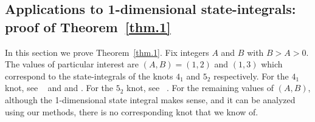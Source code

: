 \documentclass[12pt]{amsart}
\theoremstyle{definition}
\begin{document}
\subsection{Applications to 1-dimensional state-integrals: 
proof of Theorem~\ref{thm.1}}
\label{sub.application}

In this section we prove Theorem~\ref{thm.1}. 
Fix integers $A$ and $B$ with $B>A>0$. The values of particular 
interest are $(A,B)=(1,2)$ and $(1,3)$ which correspond to the state-integrals
of the knots $4_1$ and $5_2$ respectively. For the
$4_1$ knot, see ~\cite[Eqn.38]{AK} and \cite[Eqn.47]{KLV} and 
\cite{state-integrals}. For the $5_2$ knot, see ~\cite[Eqn.53]{KLV}.
For the remaining values of $(A,B)$, although the 1-dimensional state integral
makes sense, and it can be analyzed using our methods, there is no 
corresponding knot that we know of.
\end{document}
